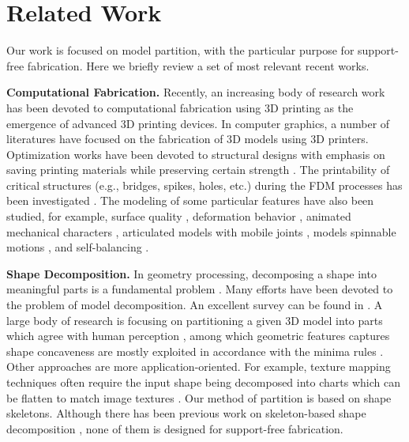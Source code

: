 \section{Related Work}

Our work is focused on model partition, with the particular purpose for support-free fabrication. Here we briefly review a set of most relevant recent works.

\textbf{Computational Fabrication.} Recently, an increasing body of research work has been devoted to computational fabrication using 3{D} printing as the emergence of advanced 3{D} printing devices. In computer graphics, a number of literatures have focused on the fabrication of 3{D} models using 3{D} printers. Optimization works have been devoted to structural designs with emphasis on saving printing materials while preserving certain strength \cite{StavaVBCM12,ZhouPZ13,WangWYLTTDCL13,Umetani:2013:CSA,wang2013cost,LuSZWFCSTCC14,hornus2015tight,xie2017support}. The printability of critical structures (e.g., bridges, spikes, holes, etc.) during the FDM processes has been investigated \cite{telea2011voxel,DumasHL14}. The modeling of some particular features have also been studied, for example, surface quality \cite{wang2016improved}, deformation behavior \cite{SkourasTCBG13}, animated mechanical characters \cite{CorosTNSFSMB13,CeylanLMAP13}, articulated models with mobile joints \cite{BacherBJP12,CaliCAKSKW12}, models spinnable motions \cite{Bacher14}, and self-balancing \cite{PrevostWLS13}.

\textbf{Shape Decomposition.} In geometry processing, decomposing a shape into meaningful parts is a fundamental problem \cite{Kaick:2014:SSA}. Many efforts have been devoted to the problem of model decomposition. An excellent survey can be found in \cite{Shamir08}. A large body of research is focusing on partitioning a given 3{D} model into parts which agree with human perception \cite{KatzT03,KatzLT05,JiLCW06,LiuZ07,Golovinskiy:2008,ChenGF09,KaickFKAC14}, among which geometric features captures shape concaveness are mostly exploited in accordance with the minima rules \cite{hoffman1984parts,hoffman1997salience}. Other approaches are more application-oriented. For example, texture mapping techniques often require the input shape being decomposed into charts which can be flatten to match image textures \cite{zhou2004iso,Garcia:2008:IIG}. Our method of partition is based on shape skeletons. Although there has been previous work on skeleton-based shape decomposition \cite{lien2006simultaneous,reniers2007skeleton,AuTCCL08}, none of them is designed for support-free fabrication.


